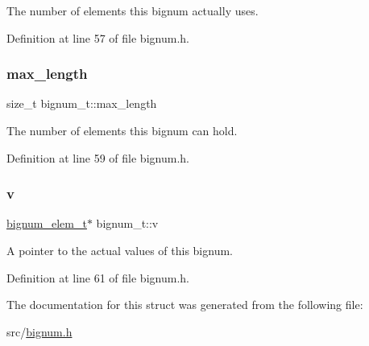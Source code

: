 The number of elements this bignum actually uses. 

Definition at line 57 of file bignum.\+h.

\mbox{\label{structbignum__t_a04a8be2cd406e93b255453a89907e578}} 
\subsubsection{\texorpdfstring{max\+\_\+length}{max\_length}}
{\footnotesize\ttfamily size\+\_\+t bignum\+\_\+t\+::max\+\_\+length}

The number of elements this bignum can hold. 

Definition at line 59 of file bignum.\+h.

\mbox{\label{structbignum__t_a1b6bf900c7f36fd981ba7de0adc8a771}} 
\subsubsection{\texorpdfstring{v}{v}}
{\footnotesize\ttfamily \hyperlink{bignum_8h_ac19e9b7c8236cb1d9e8b4bf16d0ce513}{bignum\+\_\+elem\+\_\+t}$\ast$ bignum\+\_\+t\+::v}

A pointer to the actual values of this bignum. 

Definition at line 61 of file bignum.\+h.



The documentation for this struct was generated from the following file\+:\begin{DoxyCompactItemize}
\item 
src/\hyperlink{bignum_8h}{bignum.\+h}\end{DoxyCompactItemize}
